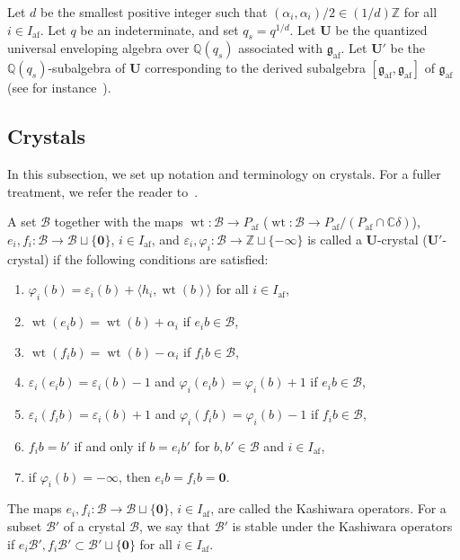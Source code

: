 \documentclass[10pt]{amsart}
\theoremstyle{definition}\newtheorem{defi}[theo]{Definition}
\theoremstyle{remark}\newtheorem{rema}[theo]{Remark}
\newcommand{\Fg}{\mathfrak{g}}
\newcommand{\BC}{\mathbb{C}}
\newcommand{\BQ}{\mathbb{Q}}
\newcommand{\BZ}{\mathbb{Z}}
\newcommand\bm[1]{\boldsymbol{#1}}
\newcommand{\U}{\mathbf{U}}
\DeclareMathOperator{\af}{af}
\DeclareMathOperator{\wt}{wt}
\begin{document}
Let $d$ be the smallest positive integer such that
$(\alpha_i , \alpha_i) / 2 \in (1/d)\BZ$ 
for all $i \in I_{\af}$. 
Let $q$ be an indeterminate, and set
$q_s = q^{1/d}$. 
Let 
$\U$
be the quantized universal enveloping algebra over $\BQ(q_s)$
associated with $\Fg_{\af}$. 
Let 
$\U'$
be the $\BQ(q_s)$-subalgebra of $\U$ 
corresponding to the derived subalgebra
$[\Fg_{\af},\Fg_{\af}]$ of $\Fg_{\af}$
(see for instance~\cite[\S~2.2]{BN04}). 

\subsection{Crystals} \label{Subsection:Crystals}

In this subsection, 
we set up notation and terminology on crystals. 
For a fuller treatment, we refer the reader to~\cite{AK,K94,K95,K02}. 

A set
$\mathcal{B}$
together with the maps
$\wt : \mathcal{B} \rightarrow P_{\af}$
(\resp $\wt : \mathcal{B} \rightarrow P_{\af} / (P_{\af} \cap \BC \delta)$), 
$e_i , f_i : \mathcal{B} \rightarrow \mathcal{B} \sqcup \{ \bm{0} \}$, $i \in I_{\af}$, 
and 
$\varepsilon_i , \varphi_i : \mathcal{B} \rightarrow \BZ \sqcup \{ -\infty \}$
is called a $\U$-crystal (\resp $\U'$-crystal) if the following conditions are satisfied:
\begin{enumerate}[label=(C\arabic*)]
\item
$\varphi_i(b) = \varepsilon_i(b) + \langle h_i , \wt (b) \rangle$ 
for all 
$i \in I_{\af}$, 
\item
$\wt (e_i b) = \wt (b) + \alpha_i$ 
if 
$e_i b \in \mathcal{B}$, 
\item
$\wt (f_i b) = \wt (b) - \alpha_i$ 
if 
$f_i b \in \mathcal{B}$, 
\item
$\varepsilon_i (e_i b) = \varepsilon_i(b) - 1$
and 
$\varphi_i (e_i b) = \varphi_i(b) + 1$
if 
$e_i b \in \mathcal{B}$, 
\item
$\varepsilon_i (f_i b) = \varepsilon_i(b) + 1$
and 
$\varphi_i (f_i b) = \varphi_i(b) - 1$
if 
$f_i b \in \mathcal{B}$, 
\item
$f_i b = b'$
if and only if 
$b = e_i b'$
for 
$b,b' \in \mathcal{B}$ 
and 
$i \in I_{\af}$, 
\item
if 
$\varphi_i(b) = -\infty$, 
then
$e_i b = f_i b = \bm{0}$.
\end{enumerate}
The maps 
$e_i , f_i : \mathcal{B} \rightarrow \mathcal{B} \sqcup \{ \bm{0} \}$, $i \in I_{\af}$, 
are called the Kashiwara operators. 
For a subset $\mathcal{B}'$ of a crystal $\mathcal{B}$, 
we say that $\mathcal{B}'$ is stable under the Kashiwara operators if
$e_i \mathcal{B}' , f_i \mathcal{B}' \subset \mathcal{B}' \sqcup \{ \bm{0} \}$
for all 
$i \in I_{\af}$.
\end{document}
